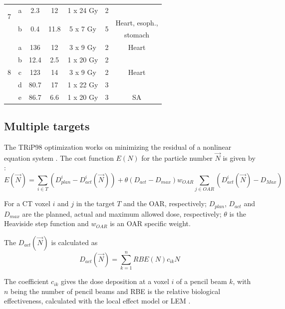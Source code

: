 \begin{table}[H]
\begin{tabular}{|c|c|c|c|c|c|c|}
		 \hline
		 \multirow{2}{*}{7} & a & 2.3 & 12  & 1 x 24 Gy & 2 &\\
		 & \multirow{2}{*}{b} & \multirow{2}{*}{0.4} & \multirow{2}{*}{11.8}  & \multirow{2}{*}{5 x 7 Gy} & \multirow{2}{*}{5} & Heart, esoph., \\
		 & & & & & & stomach \\
		 \hline
		 \multirow{5}{*}{8} & a & 136 & 12  & 3 x 9 Gy & 2 & Heart\\
		  & b & 12.4 & 2.5  & 1 x 20 Gy & 2 &\\
		  & c & 123 & 14  & 3 x 9 Gy & 2  &Heart \\
		 & d & 80.7 & 17  & 1 x 22 Gy & 3  &\\
		 & e & 86.7 & 6.6  & 1 x 20 Gy & 3 & SA \\
		\hline\hline
	\end{tabular}
	\label{tab:patdata2}
\end{table}


\newpage

\subsection{Multiple targets}

The TRiP98 optimization works on minimizing the residual of a nonlinear equation system \cite{Kraemer2000a}. The cost function $E(N)$ for the particle number $\vec{N}$ is given by  :
\begin{equation}
\label{eq-costFunc}
 E(\vec{N}) = \sum_{i\in T} \left( D_{plan}^{i} - D_{act}^{i}(\vec{N})\right) +  \theta(D_{act}-D_{max})w_{OAR}\sum_{j\in OAR} \left( D_{act}^{i}(\vec{N}) - D_{Max} \right)
\end{equation}

For a CT voxel $i$ and $j$ in the target $T$ and the OAR, respectively; $ D_{plan}$, $D_{act}$ and $D_{max}$ are the planned, actual and maximum allowed dose, respectively; $\theta$ is the 
Heaviside step function and $w_{OAR}$ is an OAR specific weight.

The $D_{act}(\vec{N})$ is calculated as
\begin{equation}
 D_{act}(\vec{N}) = \sum_{k=1}^n RBE(N) c_{ik}N 
\end{equation}

The coefficient $c_{ik}$ gives the dose deposition at a voxel $i$ of a pencil beam $k$, 
with $n$ being the number of pencil beams and RBE is the relative biological effectiveness, calculated with the local effect model or LEM \cite{Elsaesser2010} . 

